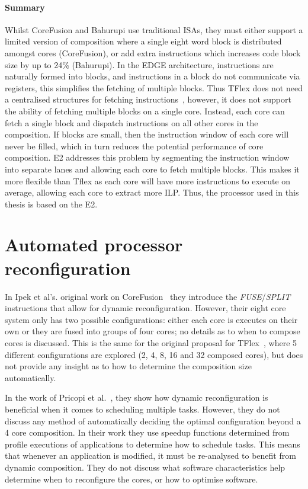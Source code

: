 \paragraph*{Summary}
Whilst CoreFusion and Bahurupi use traditional ISAs, they must either support a limited version of composition where a single eight word block is distributed amongst cores (CoreFusion), or add extra instructions which increases code block size by up to 24\% (Bahurupi).
In the EDGE architecture, instructions are naturally formed into blocks, and instructions in a block do not communicate via registers, this simplifies the fetching of multiple blocks.
Thus TFlex does not need a centralised structures for fetching instructions~\cite{kim2007tflex}, however, it does not support the ability of fetching multiple blocks on a single core.
Instead, each core can fetch a single block and dispatch instructions on all other cores in the composition.
If blocks are small, then the instruction window of each core will never be filled, which in turn reduces the potential performance of core composition.
E2 addresses this problem by segmenting the instruction window into separate lanes and allowing each core to fetch multiple blocks.
This makes it more flexible than Tflex as each core will have more instructions to execute on average, allowing each core to extract more ILP.
Thus, the processor used in this thesis is based on the E2.

\section{Automated processor reconfiguration}

In Ipek et al's. original work on CoreFusion~\cite{ipek2007CoreFusion} they introduce the \textit{FUSE}/\textit{SPLIT} instructions that allow for dynamic reconfiguration.
However, their eight core system only has two possible configurations: either each core is executes on their own or they are fused into groups of four cores; no details as to when to compose cores is discussed.
This is the same for the original proposal for TFlex~\cite{kim2007tflex}, where 5 different configurations are explored (2, 4, 8, 16 and 32 composed cores), but does not provide any insight as to how to determine the composition size automatically.

In the work of Pricopi et al.~\cite{pricopiSchedCoreComp2014}, they show how dynamic reconfiguration is beneficial when it comes to scheduling multiple tasks.
However, they do not discuss any method of automatically deciding the optimal configuration beyond a 4 core composition.
In their work they use speedup functions determined from profile executions of applications to determine how to schedule tasks.
This means that whenever an application is modified, it must be re-analysed to benefit from dynamic composition.
They do not discuss what software characteristics help determine when to reconfigure the cores, or how to optimise software.

